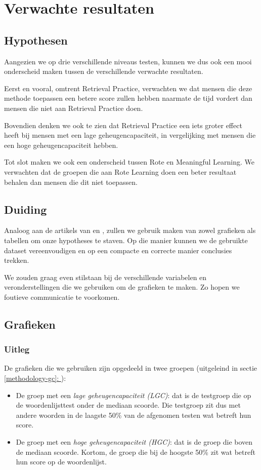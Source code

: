 \documentclass{hogent-article}
\newcommand{\customref}[1]{\underline{\ref{#1}: \nameref{#1}}}
\begin{document}
\section{Verwachte resultaten}

\subsection{Hypothesen}

Aangezien we op drie verschillende niveaus testen, kunnen we dus ook een mooi onderscheid maken tussen de verschillende verwachte resultaten.

Eerst en vooral, omtrent Retrieval Practice, verwachten we dat mensen die deze methode toepassen een betere score zullen hebben naarmate de tijd vordert dan mensen die niet aan Retrieval Practice doen.

Bovendien denken we ook te zien dat Retrieval Practice een iets groter effect heeft bij mensen met een lage geheugencapaciteit, in vergelijking met mensen die een hoge geheugencapaciteit hebben.

Tot slot maken we ook een onderscheid tussen Rote en Meaningful Learning. We verwachten dat de groepen die aan Rote Learning doen een beter resultaat behalen dan mensen die dit niet toepassen. 

\subsection{Duiding}

Analoog aan de artikels van \textcite{Roediger_2006} en \textcite{Agarwal_2016}, zullen we gebruik maken van zowel grafieken als tabellen om onze hypotheses te staven. Op die manier kunnen we de gebruikte dataset vereenvoudigen en op een compacte en correcte manier conclusies trekken.\\
\par
\noindent
We zouden graag even stilstaan bij de verschillende variabelen en veronderstellingen die we gebruiken om de grafieken te maken. Zo hopen we foutieve communicatie te voorkomen.

\subsection{Grafieken}
\subsubsection{Uitleg}
De grafieken die we gebruiken zijn opgedeeld in twee groepen (uitgeleind in sectie \customref{methodology-gc}):
\begin{itemize}
	\item De groep met een \textit{lage geheugencapaciteit (LGC)}: dat is de testgroep die op de woordenlijsttest onder de mediaan scoorde. Die testgroep zit dus met andere woorden in de laagste 50\% van de afgenomen testen wat betreft hun score.
	\item De groep met een \textit{hoge geheugencapaciteit (HGC)}: dat is de groep die boven de mediaan scoorde. Kortom, de groep die bij de hoogste 50\% zit wat betreft hun score op de woordenlijst.
\end{itemize}
\end{document}
